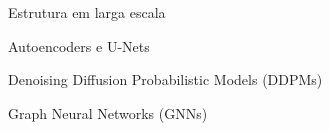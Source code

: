 \begin{frame}[c]{Estrutura em larga escala}
    \centering



    \begin{tcolorbox}[hbox] %
        \large Autoencoders e U-Nets
    \end{tcolorbox}
    \vspace{0.5cm}
    \begin{tcolorbox}[hbox] %
        \large Denoising Diffusion Probabilistic Models (DDPMs)
    \end{tcolorbox}
    \vspace{0.5cm}
    \begin{tcolorbox}[hbox] %
        \large Graph Neural Networks (GNNs)
    \end{tcolorbox}
\end{frame}

